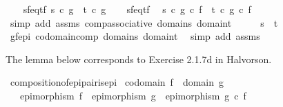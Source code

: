 \begin{isabellebody}
\ \ \isamarkupfalse%
\ sf{\isacharunderscore}{\kern0pt}eq{\isacharunderscore}{\kern0pt}tf{\isacharcolon}{\kern0pt}\ {\isachardoublequoteopen}s\ {\isasymcirc}\isactrlsub c\ g\ {\isacharequal}{\kern0pt}\ t\ {\isasymcirc}\isactrlsub c\ g{\isachardoublequoteclose}\isanewline
\isanewline
\ \ \isamarkupfalse%
\ sf{\isacharunderscore}{\kern0pt}eq{\isacharunderscore}{\kern0pt}tf\ \isamarkupfalse%
\ {\isachardoublequoteopen}s\ {\isasymcirc}\isactrlsub c\ {\isacharparenleft}{\kern0pt}g\ {\isasymcirc}\isactrlsub c\ f{\isacharparenright}{\kern0pt}\ {\isacharequal}{\kern0pt}\ t\ {\isasymcirc}\isactrlsub c\ {\isacharparenleft}{\kern0pt}g\ {\isasymcirc}\isactrlsub c\ f{\isacharparenright}{\kern0pt}{\isachardoublequoteclose}\isanewline
\ \ \ \ \isamarkupfalse%
\ {\isacharparenleft}{\kern0pt}simp\ add{\isacharcolon}{\kern0pt}\ assms\ comp{\isacharunderscore}{\kern0pt}associative\ domain{\isacharunderscore}{\kern0pt}s\ domain{\isacharunderscore}{\kern0pt}t{\isacharparenright}{\kern0pt}\isanewline
\ \ \isamarkupfalse%
\ \isamarkupfalse%
\ {\isachardoublequoteopen}s\ {\isacharequal}{\kern0pt}\ t{\isachardoublequoteclose}\isanewline
\ \ \ \ \isamarkupfalse%
\ gf{\isacharunderscore}{\kern0pt}epi\ codomain{\isacharunderscore}{\kern0pt}comp\ domain{\isacharunderscore}{\kern0pt}s\ domain{\isacharunderscore}{\kern0pt}t\ \isamarkupfalse%
\ {\isacharparenleft}{\kern0pt}simp\ add{\isacharcolon}{\kern0pt}\ assms{\isacharparenright}{\kern0pt}\isanewline
{}\isamarkupfalse%
%
\endisatagproof
{\isafoldproof}%
%
\isadelimproof
%
\endisadelimproof
%
\begin{isamarkuptext}%
The lemma below corresponds to Exercise 2.1.7d in Halvorson.%
\end{isamarkuptext}\isamarkuptrue%
\isamarkupfalse%
\ composition{\isacharunderscore}{\kern0pt}of{\isacharunderscore}{\kern0pt}epi{\isacharunderscore}{\kern0pt}pair{\isacharunderscore}{\kern0pt}is{\isacharunderscore}{\kern0pt}epi{\isacharcolon}{\kern0pt}\isanewline
{}\ {\isachardoublequoteopen}codomain\ f\ {\isacharequal}{\kern0pt}\ domain\ g{\isachardoublequoteclose}\isanewline
\ \ \ {\isachardoublequoteopen}epimorphism\ f\ {\isasymLongrightarrow}\ epimorphism\ g\ {\isasymLongrightarrow}\ epimorphism\ {\isacharparenleft}{\kern0pt}g\ {\isasymcirc}\isactrlsub c\ f{\isacharparenright}{\kern0pt}{\isachardoublequoteclose}\isanewline
%
\isadelimproof
\ \ %
\endisadelimproof
%
\isatagproof

\end{isabellebody}
